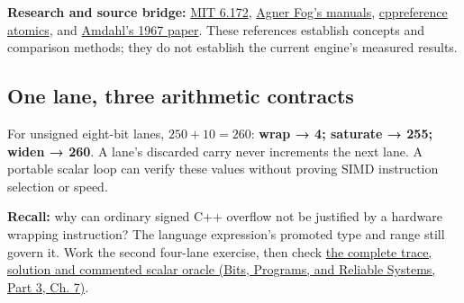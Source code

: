 \textbf{Research and source bridge:} \href{https://ocw.mit.edu/courses/6-172-performance-engineering-of-software-systems-fall-2018/video_galleries/lecture-videos/}{MIT 6.172}, \href{https://www.agner.org/optimize/}{Agner Fog's manuals}, \href{https://en.cppreference.com/w/cpp/atomic/memory_order}{cppreference atomics}, and \href{https://doi.org/10.1145/1465482.1465560}{Amdahl's 1967 paper}. These references establish concepts and comparison methods; they do not establish the current engine's measured results.

\subsection{One lane, three arithmetic contracts}\label{appendix-2587680a4fe3-one-lane-three-arithmetic-contracts}

\hypertarget{appendix-2587680a4fe3-one-lane-three-arithmetic-contracts}{}

For unsigned eight-bit lanes, \(250+10=260\): \textbf{wrap → 4; saturate → 255; widen → 260}. A lane's discarded carry never increments the next lane. A portable scalar loop can verify these values without proving SIMD instruction selection or speed.

\textbf{Recall:} why can ordinary signed C++ overflow not be justified by a hardware wrapping instruction? The language expression's promoted type and range still govern it. Work the second four-lane exercise, then check \href{../01-Bits-Programs-and-Reliable-Systems-P03/main.pdf\#01-foundations-i-ch007-three-lane-arithmetic-contracts-wrap-saturate-and-widen}{the complete trace, solution and commented scalar oracle (Bits, Programs, and Reliable Systems, Part 3, Ch. 7)}.
